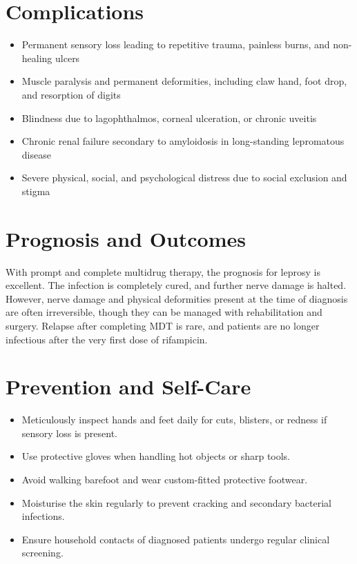 \section*{Complications}
\begin{itemize}
    \item Permanent sensory loss leading to repetitive trauma, painless burns, and non-healing ulcers
    \item Muscle paralysis and permanent deformities, including claw hand, foot drop, and resorption of digits
    \item Blindness due to lagophthalmos, corneal ulceration, or chronic uveitis
    \item Chronic renal failure secondary to amyloidosis in long-standing lepromatous disease
    \item Severe physical, social, and psychological distress due to social exclusion and stigma
\end{itemize}

\section*{Prognosis and Outcomes}
With prompt and complete multidrug therapy, the prognosis for leprosy is excellent. The infection is completely cured, and further nerve damage is halted. However, nerve damage and physical deformities present at the time of diagnosis are often irreversible, though they can be managed with rehabilitation and surgery. Relapse after completing MDT is rare, and patients are no longer infectious after the very first dose of rifampicin.

\section*{Prevention and Self-Care}
\begin{itemize}
    \item Meticulously inspect hands and feet daily for cuts, blisters, or redness if sensory loss is present.
    \item Use protective gloves when handling hot objects or sharp tools.
    \item Avoid walking barefoot and wear custom-fitted protective footwear.
    \item Moisturise the skin regularly to prevent cracking and secondary bacterial infections.
    \item Ensure household contacts of diagnosed patients undergo regular clinical screening.
\end{itemize}

